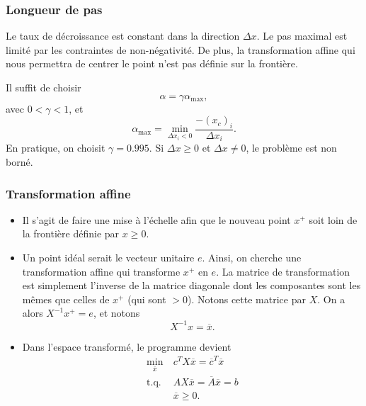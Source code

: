 \documentclass[t,usepdftitle=false]{beamer}
\begin{document}
\begin{frame}
	\frametitle{Longueur de pas}
	
	Le taux de décroissance est constant dans la direction $\Delta x$.
	Le pas maximal est limité par les contraintes de non-négativité.
	De plus, la transformation affine qui nous permettra de centrer le point n'est pas définie sur la frontière.
	
	\mbox{}
	
	Il suffit de choisir
	$$
	\alpha = \gamma\alpha_{\max},
	$$
	avec $0 < \gamma < 1$, et
	$$
	\alpha_{\max} = \min_{\Delta x_i < 0} \frac{-(x_c)_i}{\Delta x_i}.
	$$
	En pratique, on choisit $\gamma  = 0.995$.
	Si $\Delta x \geq 0$ et $\Delta x \ne 0$, le problème est non borné.
	
\end{frame}

\begin{frame}
	\frametitle{Transformation affine}
	
\begin{itemize}
	\item 
	Il s'agit de faire une mise à l'échelle afin que le nouveau point $x^+$ soit loin de la frontière définie par $x \geq 0$.
	\item 
	Un point idéal serait le vecteur unitaire $e$. Ainsi, on cherche une transformation
	affine qui transforme $x^+$ en $e$.
	La matrice de transformation est simplement l'inverse de la matrice diagonale dont les
	composantes sont les mêmes que celles de $x^+$ (qui sont $>0$).
	Notons cette matrice par $X$.
	On a alors $X^{-1}x^+ = e$, et notons
	$$
	X^{-1}x = \overline{x}.
	$$
	\item 
	Dans l'espace transformé, le programme devient
	\begin{align*}
		\min_{\overline{x}} \ & c^TX\overline{x} = \overline{c}^T\overline{x} \\
		\mbox{t.q. } & AX\overline{x} = \overline{A}\overline{x} = b\\
		& \overline{x} \geq 0.
	\end{align*}
\end{itemize}
	
\end{frame}
\end{document}
